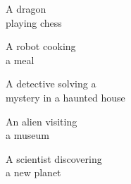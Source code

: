 \begin{figure*}[h]
\vspace{1ex}
\begin{minipage}[t]{.025\textwidth}
     \vspace{0pt}
\end{minipage}%
\hspace{1ex}%
\begin{minipage}[t]{0.98\figwidth}
    \vspace{2mm}
    \begin{minipage}[t]{0.2\textwidth}
        \centering
        A dragon\\playing chess
    \end{minipage}%
    \begin{minipage}[t]{0.2\textwidth}
        \centering
        A robot cooking\\a meal
    \end{minipage}%
    \begin{minipage}[t]{0.2\textwidth}
        \centering
        A detective solving a\\mystery in a haunted house
    \end{minipage}%
    \begin{minipage}[t]{0.2\textwidth}
        \centering
        An alien visiting\\a museum
    \end{minipage}%
    \begin{minipage}[t]{0.2\textwidth}
        \centering
        A scientist discovering\\a new planet
    \end{minipage}%
\end{minipage}


\end{figure*}
